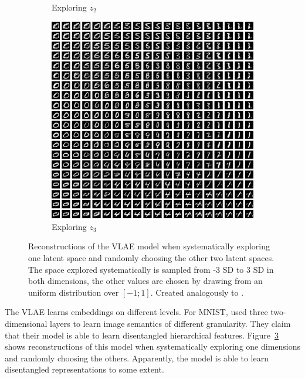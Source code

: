 \begin{figure}[t]
\begin{subfigure}{0.3\textwidth}
        \caption{Exploring $z_{2}$}
        \label{subfig:vlae_plots2}
    \end{subfigure}
    \hfill
    \begin{subfigure}{0.3\textwidth}
        \centering
        \includegraphics[width=\textwidth]{images/vlae_plots3.png}
        \caption{Exploring $z_3$}
        \label{subfig:vlae_plots3}
    \end{subfigure}
    \caption{Reconstructions of the VLAE model when systematically exploring one latent space and randomly choosing the other two latent spaces. The space explored systematically is sampled from -3 SD to 3 SD in both dimensions, the other values are chosen by drawing from an uniform distribution over $[-1; 1]$. Created analogously to \citet[Figure 5]{zhao2017learning}.}
    \label{fig:vlae_plots}
\end{figure}
The VLAE learns embeddings on different levels.
For MNIST, \citet{zhao2017learning} used three two-dimensional layers to learn image semantics of different granularity.
They claim that their model is able to learn disentangled hierarchical features.
Figure~\ref{fig:vlae_plots} shows reconstructions of this model when systematically exploring one dimensions and randomly choosing the others.
Apparently, the model is able to learn disentangled representations to some extent.


